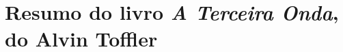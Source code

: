 \section{
    Resumo do livro \textit{A Terceira Onda}, do Alvin Toffler
    }

\setlength{\parindent}{4em}
\setlength{\parskip}{0.5em}
\renewcommand{\baselinestretch}{1}



%
